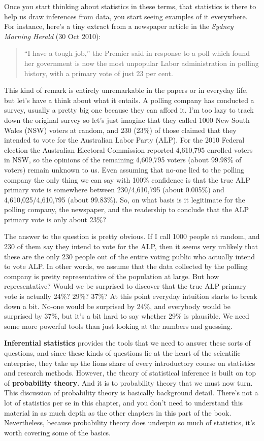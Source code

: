 \documentclass[
  a4paper,
]{book}
\begin{document}
Once you start thinking about statistics in these terms, that statistics
is there to help us draw inferences from data, you start seeing examples
of it everywhere. For instance, here's a tiny extract from a newspaper
article in the \emph{Sydney Morning Herald} (30 Oct 2010):

\begin{quote}
``I have a tough job,'' the Premier said in response to a poll which
found her government is now the most unpopular Labor administration in
polling history, with a primary vote of just 23 per cent.
\end{quote}

This kind of remark is entirely unremarkable in the papers or in
everyday life, but let's have a think about what it entails. A polling
company has conducted a survey, usually a pretty big one because they
can afford it. I'm too lazy to track down the original survey so let's
just imagine that they called 1000 New South Wales (NSW) voters at
random, and 230 (23\%) of those claimed that they intended to vote for
the Australian Labor Party (ALP). For the 2010 Federal election the
Australian Electoral Commission reported 4,610,795 enrolled voters in
NSW, so the opinions of the remaining 4,609,795 voters (about 99.98\% of
voters) remain unknown to us. Even assuming that no-one lied to the
polling company the only thing we can say with 100\% confidence is that
the true ALP primary vote is somewhere between 230/4,610,795 (about
0.005\%) and 4,610,025/4,610,795 (about 99.83\%). So, on what basis is
it legitimate for the polling company, the newspaper, and the readership
to conclude that the ALP primary vote is only about 23\%?

The answer to the question is pretty obvious. If I call 1000 people at
random, and 230 of them say they intend to vote for the ALP, then it
seems very unlikely that these are the only 230 people out of the entire
voting public who actually intend to vote ALP. In other words, we assume
that the data collected by the polling company is pretty representative
of the population at large. But how representative? Would we be
surprised to discover that the true ALP primary vote is actually 24\%?
29\%? 37\%? At this point everyday intuition starts to break down a bit.
No-one would be surprised by 24\%, and everybody would be surprised by
37\%, but it's a bit hard to say whether 29\% is plausible. We need some
more powerful tools than just looking at the numbers and guessing.

\textbf{Inferential statistics} provides the tools that we need to
answer these sorts of questions, and since these kinds of questions lie
at the heart of the scientific enterprise, they take up the lions share
of every introductory course on statistics and research methods.
However, the theory of statistical inference is built on top of
\textbf{probability theory}. And it is to probability theory that we
must now turn. This discussion of probability theory is basically
background detail. There's not a lot of statistics per se in this
chapter, and you don't need to understand this material in as much depth
as the other chapters in this part of the book. Nevertheless, because
probability theory does underpin so much of statistics, it's worth
covering some of the basics.
\end{document}
